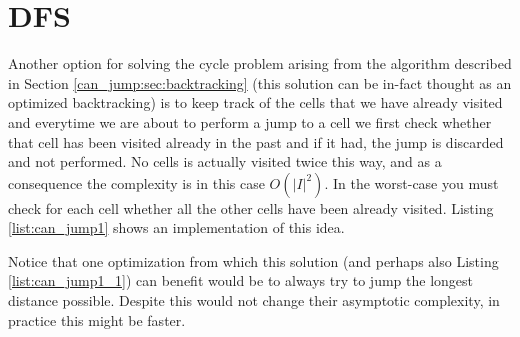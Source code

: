 	
 
\section{DFS}
\label{can_jump:sec:DFS}
Another option for solving the cycle problem arising from the algorithm described in Section
\ref{can_jump:sec:backtracking} (this solution can be in-fact thought as an optimized backtracking)
is to keep track of the cells that we have already visited and everytime we are about to perform a
jump to a cell we first check whether that cell has been visited already in the past and if it had,
the jump is discarded and not performed. No cells is actually visited twice this way, and as a
consequence the complexity is in this case $O(|I|^2)$. In the worst-case you must check for each
cell whether all the other cells have been already visited. Listing \ref{list:can_jump1} shows an
implementation of this idea. 




Notice that one optimization from which this solution (and perhaps also Listing
\ref{list:can_jump1_1}) can benefit would be to always try to jump the longest distance possible.
Despite this would not change their asymptotic complexity, in practice this might be faster.


